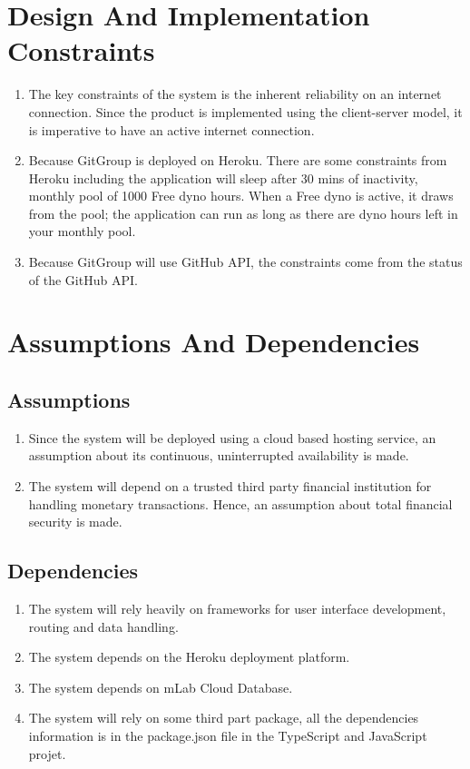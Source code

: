 \documentclass[12pt,a4paper]{report}
\begin{document}
\section{Design And Implementation Constraints}
\begin{enumerate}
	\renewcommand{\labelenumi}{{\textbf{\arabic{enumi}.}}}
	\item The key constraints of the system is the inherent reliability on an internet connection. Since the product is implemented using the client-server model, it is imperative to have an active internet connection.  
	\item Because GitGroup is deployed on Heroku. There are some constraints from Heroku including the application will sleep after 30 mins of inactivity, monthly pool of 1000 Free dyno hours. When a Free dyno is active, it draws from the pool; the application can run as long as there are dyno hours left in your monthly pool.
	\item Because GitGroup will use GitHub API, the constraints come from the status of the GitHub API.
\end{enumerate}
\section{Assumptions And Dependencies}
	\subsection{Assumptions}
	\begin{enumerate}
		\renewcommand{\labelenumi}{{\textbf{\arabic{enumi}.}}}
		\item Since the system will be deployed using a cloud based hosting service, an assumption about its continuous, uninterrupted availability is made.   
		\item The system will depend on a trusted third party financial institution for handling monetary transactions. Hence, an assumption about total financial security is made. 
	\end{enumerate}
	\subsection{Dependencies}
		\begin{enumerate}
		\renewcommand{\labelenumi}{{\textbf{\arabic{enumi}.}}}
		\item The system will rely heavily on frameworks for user interface development, routing and data handling.   
		\item The system depends on the Heroku deployment platform.
		\item The system depends on mLab Cloud Database.
		\item The system will rely on some third part package, all the dependencies information is in the package.json file in the TypeScript and JavaScript projet.
	\end{enumerate}
\end{document}
